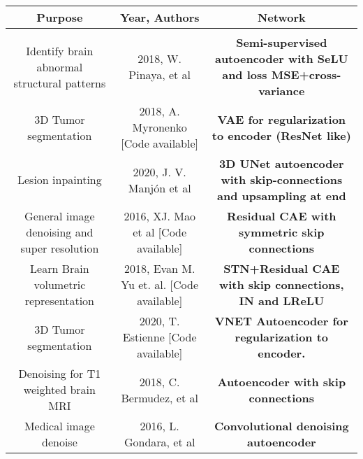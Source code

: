 \begin{table}[!ht]
    \setlength\extrarowheight{2pt} %
    \begin{tabularx}{\textwidth}{C C C}
    \toprule
        \textbf{Purpose} & \textbf{Year, Authors} & \textbf{Network} \\
        \hline
        
        \\
        
        \hline
        
        Identify brain abnormal structural patterns & 2018, W. Pinaya, et al \cite{pinaya2019} & \textbf{Semi-supervised autoencoder with SeLU and loss MSE+cross-variance} \\
        
        3D Tumor segmentation & 2018, A. Myronenko \cite{myronenko20183d} [Code available] & \textbf{VAE for regularization to encoder (ResNet like)} \\
        
         Lesion inpainting & 2020, J. V. Manjón et al \cite{2020inpainting} & \textbf{3D UNet autoencoder with skip-connections and upsampling at end} \\
         
         General image denoising and super resolution & 2016, XJ. Mao et al \cite{superresolution} [Code available] & \textbf{Residual CAE with symmetric skip connections} \\
        
        Learn Brain volumetric representation &  2018, Evan  M.  Yu  et.   al. \cite{learnvolrepreCODE} [Code available] & \textbf{STN+Residual CAE with skip connections, IN and LReLU}\\
        
        3D Tumor segmentation & 2020, T. Estienne \cite{otherBraTS2020} [Code available] & \textbf{VNET Autoencoder for regularization to encoder.} \\
        
        Denoising for T1 weighted brain MRI & 2018, C. Bermudez, et al \cite{bermudez2018t1autoencoder} & \textbf{Autoencoder with skip connections} \\
        
        Medical image denoise & 2016, L. Gondara, et al \cite{gondara2016medicalautoencoder} &\textbf{Convolutional denoising autoencoder} \\
        

\end{tabularx}
\end{table}
